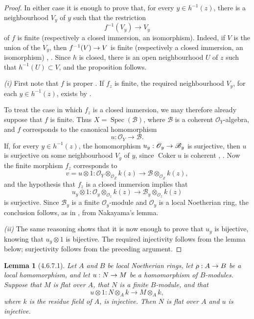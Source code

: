\documentclass[oneside]{amsart}
\theoremstyle{ega-env-style}
\theoremstyle{ega-thm-env-style}
\newtheorem*{lemma}{Lemma}
\theoremstyle{ega-defn-env-style}
\def\mathcal{\mathscr}
\def\sh{\mathcal}                   %
\def\kres{k}                        %
\def\Coker{\operatorname{Coker}}
\def\Spec{\operatorname{Spec}}
\renewcommand{\to}{\mathchoice{\longrightarrow}{\rightarrow}{\rightarrow}{\rightarrow}}
\newcommand{\oldpage}[2][]{{\marginnote{\normalfont{\textbf{#1}~|~#2}}}\ignorespaces}
\let\EGAOriginalLabel\label
\renewcommand{\label}[1]{\phantomsection\EGAOriginalLabel{#1}}
\begin{document}
\begin{proof}
In either case it is enough to prove that, for every
$y\in h^{-1}(z)$, there is a neighbourhood $V_y$ of $y$ such that
the restriction
\[
  f^{-1}(V_y)\longrightarrow V_y
\]
of $f$ is finite (respectively a closed immersion, an isomorphism).
Indeed, if $V$ is the union of the $V_y$, then
$f^{-1}(V)\to V$ is finite (respectively a closed immersion, an
isomorphism) , .  Since $h$ is
closed, there is an open neighbourhood $U$ of $z$ such that
$h^{-1}(U)\subset V$, and the proposition follows.

\noindent\textit{(i)} First note that $f$ is proper
.  If
$f_z$ is finite, the required neighbourhood $V_y$, for each
$y\in h^{-1}(z)$, exists by .

\oldpage[III]{143}

To treat the case in which $f_z$ is a closed immersion, we may
therefore already suppose that $f$ is finite.  Thus
$X=\Spec(\sh{B})$, where $\sh{B}$ is a coherent
$\sh{O}_Y$-algebra, and $f$ corresponds  to the
canonical homomorphism
\[
  u:\sh{O}_Y\longrightarrow\sh{B}.
\]
If, for every $y\in h^{-1}(z)$, the homomorphism
$u_y:\sh{O}_y\to\sh{B}_y$ is surjective, then $u$ is surjective on
some neighbourhood $V_y$ of $y$, since $\Coker u$ is coherent
, .  Now the finite morphism
$f_z$ corresponds to
\[
  v=u\otimes1:
  \sh{O}_Y\otimes_{\sh{O}_Z}\kres(z)
  \longrightarrow
  \sh{B}\otimes_{\sh{O}_Z}\kres(z),
\]
and the hypothesis that $f_z$ is a closed immersion implies that
\[
  u_y\otimes1:
  \sh{O}_y\otimes_{\sh{O}_z}\kres(z)
  \longrightarrow
  \sh{B}_y\otimes_{\sh{O}_z}\kres(z)
\]
is surjective.  Since $\sh{B}_y$ is a finite $\sh{O}_y$-module and
$\sh{O}_y$ is a local Noetherian ring, the conclusion follows, as
in , from Nakayama's lemma.

\noindent\textit{(ii)} The same reasoning shows that it is now
enough to prove
that $u_y$ is bijective, knowing that $u_y\otimes1$ is bijective.
The required injectivity follows from the lemma below; surjectivity
follows from the preceding argument.
\end{proof}

\begin{lemma}[4.6.7.1]
\label{III.4.6.7.1}
Let $A$ and $B$ be local Noetherian rings, let
$\rho:A\to B$ be a local homomorphism, and let $u:N\to M$ be a
homomorphism of $B$-modules.  Suppose that $M$ is flat over $A$,
that $N$ is a finite $B$-module, and that
\[
  u\otimes1:
  N\otimes_A k\longrightarrow M\otimes_A k,
\]
where $k$ is the residue field of $A$, is injective.  Then $N$ is
flat over $A$ and $u$ is injective.
\end{lemma}
\end{document}
